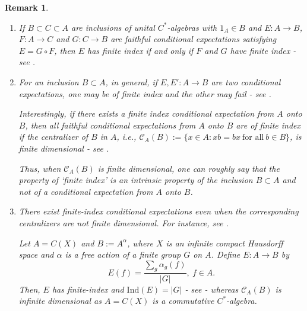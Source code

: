 \documentclass[a4]{amsart}
\newtheorem{remark}[theorem]{\bf Remark}
\numberwithin{equation}{section}
\begin{document}
\begin{remark}\label{index-facts}
  \begin{enumerate}
  \item If $B \subset C \subset A$ are inclusions of unital
    $C^*$-algebras with $1_A \in B$ and $E: A \to B$, $F: A \to C$ and
    $G: C \to B$ are faithful conditional expectations satisfying $E =
    G \circ F$, then $E$ has finite index if and only if $F$ and $G$
    have finite index - see \cite[Proposition 3.5]{MK}.
\item For an inclusion $B \subset A$, in general, if $E, E': A \to B$ are
two conditional expectations, one may be of finite index and the other
may fail - see \cite[Example 2.10.1]{Wat}.

Interestingly, if there exists a finite index conditional expectation from $A$ onto
$B$, then all faithful conditional expectations from $A$ onto $B$ are
of finite index if the centralizer of $B$ in $A$, i.e.,
$\mathcal{C}_A(B):=\{x \in A: xb=bx\ \text{for all}\ b \in B\}$, is
finite dimensional - see \cite[Propositions 2.10.2]{Wat}.


Thus, when $\mathcal{C}_A(B)$ is finite dimensional, one can roughly
say that the property of `finite index' is an intrinsic property of
the inclusion $B \subset A$ and not of a conditional expectation from
$A$ onto $B$.
\item There exist finite-index conditional expectations even when the
  corresponding centralizers are not finite dimensional. For instance, 
  see \cite[Example 2.6.7]{Wat}.

  Let $A=C(X)$ and $B:=A^\alpha$, where $X$ is an infinite compact
  Hausdorff space and $\alpha$ is a free action of a finite group $G$
  on $A$. Define $E : A \to B$ by
 \[ E (f)= \frac{\sum_{g} \alpha_{g} (f)}{|G|}, \ f\in A.
 \]
Then, $E$ has finite-index and $\mathrm{Ind}(E) = |G|$ - see
\cite[Proposition 2.8.1]{Wat} - whereas $\mathcal{C}_{A}(B)$ is
infinite dimensional as $A= C(X)$ is a commutative $C^*$-algebra.
\end{enumerate}
\end{remark}
\end{document}
